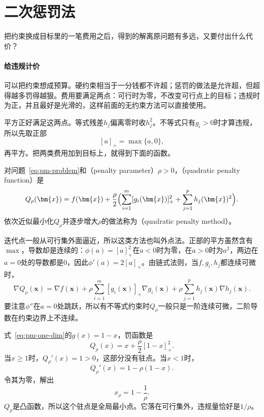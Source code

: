 \section{二次惩罚法}
\label{sec:pm-quadratic}

把约束换成目标里的一笔费用之后，得到的解离原问题有多远，又要付出什么代价？

\paragraph{给违规计价}
可以把约束想成预算。硬约束相当于一分钱都不许超；惩罚的做法是允许超，但超得越多罚得越狠。费用要满足两点：可行时为零，不改变可行点上的目标；违规时为正，并且最好是光滑的，这样前面的无约束方法可以直接使用。

平方正好满足这两点。等式残差$h_j$偏离零时收$h_j^2$。不等式只有$g_i>0$时才算违规，所以先取正部
\[
 [a]_+=\max\{a,0\},
\]
再平方。把两类费用加到目标上，就得到下面的函数。

\begin{definition}[二次罚函数]
\label{def:pm-quadratic-penalty}
对问题~\eqref{eq:pm-problem}和（penalty parameter）$\rho>0$，（quadratic penalty function）是
\begin{equation}
 Q_\rho(\bm{x})=f(\bm{x})+\frac{\rho}{2}\Bigl(\sum_{i=1}^m[g_i(\bm{x})]_+^2+\sum_{j=1}^ph_j(\bm{x})^2\Bigr).
 \label{eq:pm-quadratic-penalty}
\end{equation}
依次近似最小化$Q_\rho$并逐步增大$\rho$的做法称为（quadratic penalty method）。
\end{definition}

迭代点一般从可行集外面逼近，所以这类方法也叫外点法。正部的平方虽然含有$\max$，导数却是连续的：$\phi(a)=[a]_+^2$在$a<0$时为零，在$a>0$时为$a^2$，两边在$a=0$处的导数都是$0$，因此$\phi'(a)=2[a]_+$。由链式法则，当$f,g_i,h_j$都连续可微时，
\begin{equation}
 \nabla Q_\rho(\bm{x})=\nabla f(\bm{x})+\rho\sum_{i=1}^m[g_i(\bm{x})]_+\nabla g_i(\bm{x})+\rho\sum_{j=1}^ph_j(\bm{x})\nabla h_j(\bm{x}).
 \label{eq:pm-quadratic-gradient}
\end{equation}
要注意$\phi''$在$a=0$处跳跃，所以有不等式约束时$Q_\rho$一般只是一阶连续可微，二阶导数在约束边界上不连续。

\begin{example}[一维例的二次罚]
\label{ex:pm-quadratic-one-dim}
式~\eqref{eq:pm-one-dim}的$g(x)=1-x$，罚函数是
\[
 Q_\rho(x)=x+\frac{\rho}{2}[1-x]_+^2 .
\]
当$x\geq1$时，$Q_\rho'(x)=1>0$，这部分没有驻点。当$x<1$时，
\[
 Q_\rho'(x)=1-\rho(1-x).
\]
令其为零，解出
\[
 x_\rho=1-\frac1\rho .
\]
$Q_\rho$是凸函数，所以这个驻点是全局最小点。它落在可行集外，违规量恰好是$1/\rho$。
\end{example}

